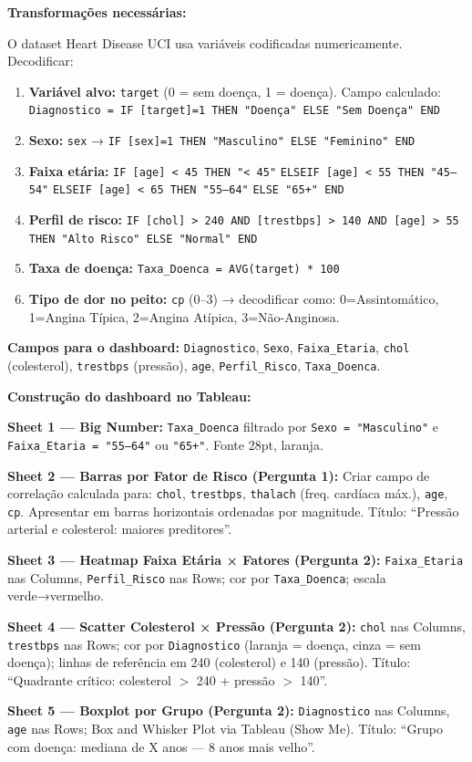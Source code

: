 \begin{SolvedBox}
\textbf{Transformações necessárias:}

O dataset Heart Disease UCI usa variáveis codificadas numericamente. Decodificar:
\begin{enumerate}
  \item \textbf{Variável alvo:} \texttt{target} (0 = sem doença, 1 = doença).
  Campo calculado: \texttt{Diagnostico = IF [target]=1 THEN "Doença" ELSE "Sem Doença" END}
  \item \textbf{Sexo:} \texttt{sex} → \texttt{IF [sex]=1 THEN "Masculino" ELSE "Feminino" END}
  \item \textbf{Faixa etária:} \texttt{IF [age] < 45 THEN "< 45"}
  \texttt{ELSEIF [age] < 55 THEN "45–54"}
  \texttt{ELSEIF [age] < 65 THEN "55–64"}
  \texttt{ELSE "65+" END}
  \item \textbf{Perfil de risco:}
  \texttt{IF [chol] > 240 AND [trestbps] > 140 AND [age] > 55}
  \texttt{THEN "Alto Risco" ELSE "Normal" END}
  \item \textbf{Taxa de doença:} \texttt{Taxa\_Doenca = AVG(target) * 100}
  \item \textbf{Tipo de dor no peito:} \texttt{cp} (0–3) → decodificar como:
  0=Assintomático, 1=Angina Típica, 2=Angina Atípica, 3=Não-Anginosa.
\end{enumerate}

\textbf{Campos para o dashboard:} \texttt{Diagnostico}, \texttt{Sexo},
\texttt{Faixa\_Etaria}, \texttt{chol} (colesterol), \texttt{trestbps} (pressão),
\texttt{age}, \texttt{Perfil\_Risco}, \texttt{Taxa\_Doenca}.
\end{SolvedBox}

\begin{SolvedBox}
\textbf{Construção do dashboard no Tableau:}

\textbf{Sheet 1 — Big Number:} \texttt{Taxa\_Doenca} filtrado por
\texttt{Sexo = "Masculino"} e \texttt{Faixa\_Etaria = "55–64"} ou \texttt{"65+"}.
Fonte 28pt, laranja.

\textbf{Sheet 2 — Barras por Fator de Risco (Pergunta 1):}
Criar campo de correlação calculada para: \texttt{chol}, \texttt{trestbps},
\texttt{thalach} (freq. cardíaca máx.), \texttt{age}, \texttt{cp}.
Apresentar em barras horizontais ordenadas por magnitude.
Título: ``Pressão arterial e colesterol: maiores preditores''.

\textbf{Sheet 3 — Heatmap Faixa Etária × Fatores (Pergunta 2):}
\texttt{Faixa\_Etaria} nas Columns, \texttt{Perfil\_Risco} nas Rows;
cor por \texttt{Taxa\_Doenca}; escala verde→vermelho.

\textbf{Sheet 4 — Scatter Colesterol × Pressão (Pergunta 2):}
\texttt{chol} nas Columns, \texttt{trestbps} nas Rows;
cor por \texttt{Diagnostico} (laranja = doença, cinza = sem doença);
linhas de referência em 240 (colesterol) e 140 (pressão).
Título: ``Quadrante crítico: colesterol $>$ 240 + pressão $>$ 140''.

\textbf{Sheet 5 — Boxplot por Grupo (Pergunta 2):}
\texttt{Diagnostico} nas Columns, \texttt{age} nas Rows;
Box and Whisker Plot via Tableau (Show Me).
Título: ``Grupo com doença: mediana de X anos — 8 anos mais velho''.
\end{SolvedBox}

